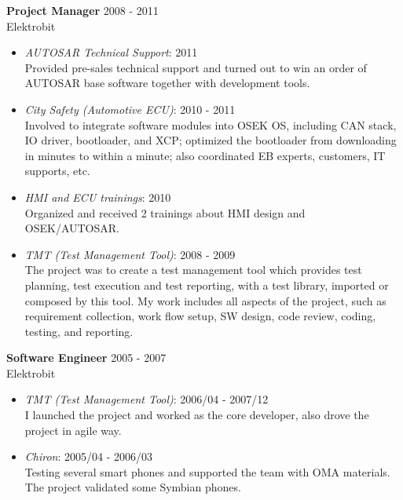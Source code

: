 \textbf{Project Manager} \hfill 2008 - 2011\\
        Elektrobit
        \begin{itemize}  \itemsep -2pt %
            \item {\em AUTOSAR Technical Support}: 2011 \\
                    Provided pre-sales technical support
                    and turned out to win an order of AUTOSAR base software together with development tools.
            \item {\em City Safety (Automotive ECU)}: 2010 - 2011 \\
                    Involved to integrate software modules into OSEK OS,
                    including CAN stack, IO driver, bootloader, and XCP;
                    optimized the bootloader from downloading in minutes to within a minute;
                    also coordinated EB experts, customers, IT supports, etc.
            \item {\em HMI and ECU trainings}: 2010\\
                Organized and received 2 trainings about HMI design and OSEK/AUTOSAR.
            \item {\em TMT (Test Management Tool)}: 2008 - 2009 \\
                    The project was to create a test management tool
                    which provides test planning, test execution and test reporting,
                    with a test library, imported or composed by this tool.
                    My work includes all aspects of the project,
                    such as requirement collection, work flow setup, SW design, code review, coding, testing, and reporting.
        \end{itemize}
 
\textbf{Software Engineer} \hfill 2005 - 2007 \\
        Elektrobit
        \begin{itemize}  \itemsep -2pt %
            \item {\em TMT (Test Management Tool)}: 2006/04 - 2007/12 \\ 
            I launched the project and worked as the core developer, also drove
            the project in agile way.
            \item {\em Chiron}: 2005/04 - 2006/03 \\
                Testing several smart phones and supported the team with OMA materials.
                The project validated some Symbian phones.
        \end{itemize}
 
